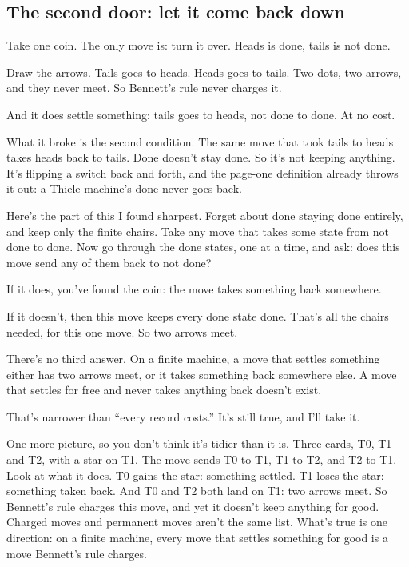 \documentclass[11pt,twoside]{article}
\theoremstyle{thielethm}
\theoremstyle{thieledef}
\theoremstyle{thieledef}
\theoremstyle{thieledef}
\theoremstyle{thielethm}
\theoremstyle{thieleobs}
\theoremstyle{thielethm}
\begin{document}
\subsection{The second door: let it come back down}

Take one coin. The only move is: turn it over. Heads is done, tails is not done.

Draw the arrows. Tails goes to heads. Heads goes to tails. Two dots, two arrows, and they never meet. So Bennett's rule never charges it.

And it does settle something: tails goes to heads, not done to done. At no cost.

What it broke is the second condition. The same move that took tails to heads takes heads back to tails. Done doesn't stay done. So it's not keeping anything. It's flipping a switch back and forth, and the page-one definition already throws it out: a Thiele machine's done never goes back.

Here's the part of this I found sharpest. Forget about done staying done entirely, and keep only the finite chairs. Take any move that takes some state from not done to done. Now go through the done states, one at a time, and ask: does this move send any of them back to not done?

If it does, you've found the coin: the move takes something back somewhere.

If it doesn't, then this move keeps every done state done. That's all the chairs needed, for this one move. So two arrows meet.

There's no third answer. On a finite machine, a move that settles something either has two arrows meet, or it takes something back somewhere else. A move that settles for free and never takes anything back doesn't exist.

That's narrower than ``every record costs.'' It's still true, and I'll take it.

One more picture, so you don't think it's tidier than it is. Three cards, T0, T1 and T2, with a star on T1. The move sends T0 to T1, T1 to T2, and T2 to T1. Look at what it does. T0 gains the star: something settled. T1 loses the star: something taken back. And T0 and T2 both land on T1: two arrows meet. So Bennett's rule charges this move, and yet it doesn't keep anything for good. Charged moves and permanent moves aren't the same list. What's true is one direction: on a finite machine, every move that settles something for good is a move Bennett's rule charges.
\end{document}

